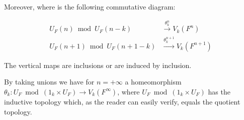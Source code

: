 Moreover, where is the following commutative diagram:

$$\begin{array}{ccc}
U_F(n) \bmod U_F(n-k) & \xrightarrow{\theta_k^n} V_k(F^n) \\
U_F(n+1) \bmod U_F(n+1-k) & \xrightarrow{\theta_k^{n+1}} V_k(F^{n+1})
\end{array}$$

The vertical maps are inclusions or are induced by inclusion.

By taking unions we have for $n = +\infty$ a homeomorphism $\theta_k: U_F \bmod (1_k \times U_F) \rightarrow V_k(F^\infty)$, where $U_F \bmod (1_k \times U_F)$ has the inductive topology which, as the reader can easily verify, equals the quotient topology.
